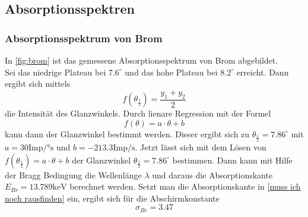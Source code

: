 \subsection{Absorptionsspektren}
\label{subsec:absorptionsspektrum}


\subsubsection*{Absorptionsspektrum von Brom}
\label{brom}

In \autoref{fig:brom} ist das gemessene Absorptionsspektrum von Brom abgebildet.\\
Sei das niedrige Plateau bei $7.6^\circ$ und das hohe Plateau bei $8.2^\circ$ erreicht. Dann ergibt sich mittels 
\begin{equation*}
  f(\theta_{\frac{1}{2}})=\frac{y_1 +y_2}{2}
\end{equation*}
die Intensität des Glanzwinkels. Durch lienare Regression mit der Formel
\begin{equation}
  f(\theta)=a\cdot\theta + b
  \label{reg}
\end{equation}
kann dann der Glanzwinkel bestimmt werden. Dieser ergibt sich zu $\theta_{\frac{1}{2}}=7.86^\circ$ mit $a=30 \textrm{Imp/°s}$ und $b=-213.3 \textrm{Imp/s}$.
Jetzt lässt sich mit dem Lösen von $f(\theta_{\frac{1}{2}})=a\cdot\theta + b$ der Glanzwinkel $\theta_{\frac{1}{2}}=7.86^\circ$ bestimmen. Dann kann mit Hilfe der Bragg Bedingung die Wellenlänge $\lambda$ und daraus die Absorptionskante $E_{Br}=13.789 \textrm{keV}$ berechnet werden.
Setzt man die Absorptionskante in \eqref{muss ich noch rausfinden} ein, ergibt sich für die Abschirmkonstante 
\begin{equation*}
  \sigma_{Br}=3.47
\end{equation*}




